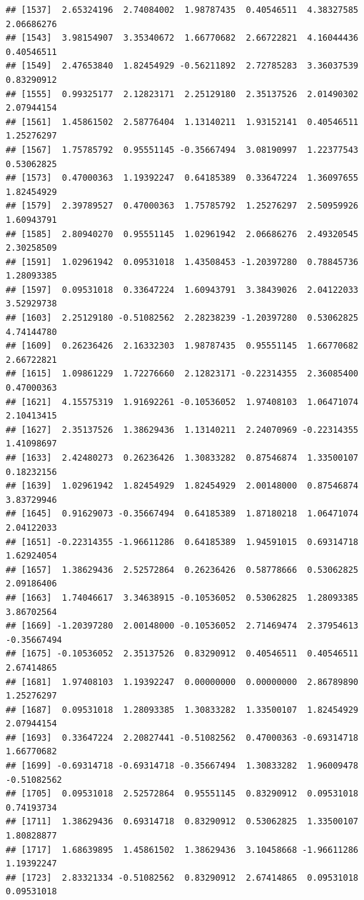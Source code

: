 \documentclass[
]{article}
\begin{document}
\begin{verbatim}
## [1537]  2.65324196  2.74084002  1.98787435  0.40546511  4.38327585  2.06686276
## [1543]  3.98154907  3.35340672  1.66770682  2.66722821  4.16044436  0.40546511
## [1549]  2.47653840  1.82454929 -0.56211892  2.72785283  3.36037539  0.83290912
## [1555]  0.99325177  2.12823171  2.25129180  2.35137526  2.01490302  2.07944154
## [1561]  1.45861502  2.58776404  1.13140211  1.93152141  0.40546511  1.25276297
## [1567]  1.75785792  0.95551145 -0.35667494  3.08190997  1.22377543  0.53062825
## [1573]  0.47000363  1.19392247  0.64185389  0.33647224  1.36097655  1.82454929
## [1579]  2.39789527  0.47000363  1.75785792  1.25276297  2.50959926  1.60943791
## [1585]  2.80940270  0.95551145  1.02961942  2.06686276  2.49320545  2.30258509
## [1591]  1.02961942  0.09531018  1.43508453 -1.20397280  0.78845736  1.28093385
## [1597]  0.09531018  0.33647224  1.60943791  3.38439026  2.04122033  3.52929738
## [1603]  2.25129180 -0.51082562  2.28238239 -1.20397280  0.53062825  4.74144780
## [1609]  0.26236426  2.16332303  1.98787435  0.95551145  1.66770682  2.66722821
## [1615]  1.09861229  1.72276660  2.12823171 -0.22314355  2.36085400  0.47000363
## [1621]  4.15575319  1.91692261 -0.10536052  1.97408103  1.06471074  2.10413415
## [1627]  2.35137526  1.38629436  1.13140211  2.24070969 -0.22314355  1.41098697
## [1633]  2.42480273  0.26236426  1.30833282  0.87546874  1.33500107  0.18232156
## [1639]  1.02961942  1.82454929  1.82454929  2.00148000  0.87546874  3.83729946
## [1645]  0.91629073 -0.35667494  0.64185389  1.87180218  1.06471074  2.04122033
## [1651] -0.22314355 -1.96611286  0.64185389  1.94591015  0.69314718  1.62924054
## [1657]  1.38629436  2.52572864  0.26236426  0.58778666  0.53062825  2.09186406
## [1663]  1.74046617  3.34638915 -0.10536052  0.53062825  1.28093385  3.86702564
## [1669] -1.20397280  2.00148000 -0.10536052  2.71469474  2.37954613 -0.35667494
## [1675] -0.10536052  2.35137526  0.83290912  0.40546511  0.40546511  2.67414865
## [1681]  1.97408103  1.19392247  0.00000000  0.00000000  2.86789890  1.25276297
## [1687]  0.09531018  1.28093385  1.30833282  1.33500107  1.82454929  2.07944154
## [1693]  0.33647224  2.20827441 -0.51082562  0.47000363 -0.69314718  1.66770682
## [1699] -0.69314718 -0.69314718 -0.35667494  1.30833282  1.96009478 -0.51082562
## [1705]  0.09531018  2.52572864  0.95551145  0.83290912  0.09531018  0.74193734
## [1711]  1.38629436  0.69314718  0.83290912  0.53062825  1.33500107  1.80828877
## [1717]  1.68639895  1.45861502  1.38629436  3.10458668 -1.96611286  1.19392247
## [1723]  2.83321334 -0.51082562  0.83290912  2.67414865  0.09531018  0.09531018

\end{verbatim}
\end{document}
